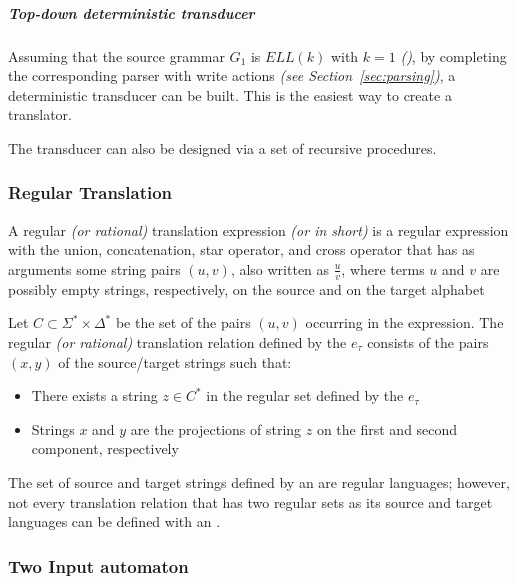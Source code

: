 \documentclass[english]{article}
\begin{document}
\subparagraph*{Top-down deterministic transducer}

Assuming that the source grammar \(G_1\) is \(\textit{ELL}(k)\) with \(k = 1\) \textit{(\ello)}, by completing the corresponding parser with write actions \textit{(see Section~\ref{sec:parsing})}, a deterministic transducer can be built.
This is the easiest way to create a translator.

The transducer can also be designed via a set of recursive procedures.

\subsubsection{Regular Translation}

A regular \textit{(or rational)} translation expression \textit{(or \rte in short)} is a regular expression with the union, concatenation, star operator, and cross operator that has as arguments some string pairs \(\left( u, v \right)\), also written as \(\frac{u}{v}\), where terms \(u\) and \(v\) are possibly empty strings, respectively, on the source and on the target alphabet

\begin{definition}
  \label{def:regular-translation-expression}
  Let \(C \subset \Sigma^\ast \times \Delta^\ast\) be the set of the pairs \(\left( u, v \right)\) occurring in the expression.
  The regular \textit{(or rational)} translation relation defined by the \rte \(e_\tau\) consists of the pairs \(\left( x, y \right)\) of the source/target strings such that:

  \begin{itemize}
    \item There exists a string \(z \in C^\ast\) in the regular set defined by the \rte \(e_\tau\)
    \item Strings \(x\) and \(y\) are the projections of string \(z\) on the first and second component, respectively
  \end{itemize}
\end{definition}

\bigskip
The set of source and target strings defined by an \rte are regular languages;
however, not every translation relation that has two regular sets as its source and target languages can be defined with an \rte.

\subsubsection{Two Input automaton}
\end{document}
